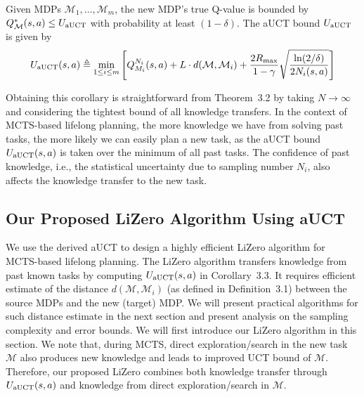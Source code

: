 \begin{corollary}
\label{cor:MDPS} 
Given MDPs $\mathcal{M}_1,\ldots,\mathcal{M}_m$, the new MDP's true Q-value is bounded by $Q_{\mathcal{M}}^{*}(s,a)\le U_{\rm aUCT}$ with probability at least $(1-\delta)$. The aUCT bound $U_{\rm aUCT}$ is given by 
\begin{equation}
\begin{aligned}   
U_{\rm aUCT}(s,a) \triangleq \min_{1\leq i\leq m}  \Bigg[ Q_{M_i}^{N_i}(s,a) + L\cdot d(\mathcal{M},\mathcal{M}_i)  +  \frac{2R_{\max}}{1-\gamma} \sqrt{\frac{\ln(2/\delta)}{2N_i(s,a)}} \Bigg]
\end{aligned}
\end{equation}
\end{corollary}
Obtaining this corollary is straightforward from Theorem~3.2 by taking $N\rightarrow \infty$ and considering the tightest bound of all knowledge transfers. In the context of MCTS-based lifelong planning, the more knowledge we have from solving past tasks, the more likely we can easily plan a new task, as the aUCT bound $U_{\rm aUCT}(s,a)$ is taken over the minimum of all past tasks. The confidence of past knowledge, i.e., the statistical uncertainty due to sampling number $N_i$, also affects the knowledge transfer to the new task.


\subsection{Our Proposed LiZero Algorithm Using aUCT}

We use the derived aUCT to design a highly efficient LiZero algorithm for MCTS-based lifelong planning. The LiZero algorithm transfers knowledge from past known tasks by computing $U_{\rm aUCT}(s,a)$ in Corollary~3.3. It requires efficient estimate of the distance $d(\mathcal{M},\mathcal{M}_i)$ (as defined in Definition~3.1) between the source MDPs and the new (target) MDP. We will present practical algorithms for such distance estimate in the next section and present analysis on the sampling complexity and error bounds. We will first introduce our LiZero algorithm in this section. We note that, during MCTS, direct exploration/search in the new task $\mathcal{M}$ also produces new knowledge and leads to improved UCT bound of $\mathcal{M}$. Therefore, our proposed LiZero combines both knowledge transfer through $U_{\rm aUCT}(s,a)$ and knowledge from direct exploration/search in $\mathcal{M}$. 




